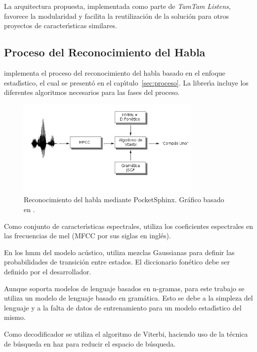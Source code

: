La arquitectura propuesta, implementada como parte de \emph{TamTam Listens}, favorece la modularidad
y facilita la reutilizaci\'on de la soluci\'on para otros proyectos de caracter{\'\i}sticas similares.

\subsection{Proceso del Reconocimiento del Habla}
\label{sec:proceso-solucion}

 implementa el proceso del reconocimiento del habla basado en el enfoque 
estad{\'\i}stico, el cual se present\'o en el cap{\'\i}tulo~\ref{sec:proceso}. La librer{\'\i}a incluye
los diferentes algoritmos necesarios para las fases del proceso.

\begin{figure}[H] 
\centering
\includegraphics[width=0.8\textwidth]{./graphics/pocketsphinx.png}
\caption{Reconocimiento del habla mediante PocketSphinx. Gr\'afico basado en \cite{VerenichASR}.}
\label{figure:proceso-pocketsphinx}
\end{figure}

Como conjunto de caracter{\'\i}sticas espectrales,  utiliza los coeficientes
espectrales en las frecuencias de mel (MFCC por sus siglas en ingl\'es).

En los \gls{hmm} del modelo ac\'ustico, utiliza mezclas Gaussianas para definir las probabilidades de 
transici\'on entre estados. El diccionario fon\'etico debe ser definido por el desarrollador.

Aunque  soporta modelos de lenguaje basados en n-gramas, para este trabajo 
se utiliza un modelo de lenguaje basado en gram\'atica. Esto se debe a la simpleza del lenguaje y a la 
falta de datos de entrenamiento para un modelo estad{\'\i}stico del mismo.

Como decodificador se utiliza el algoritmo de Viterbi, haciendo uso de la t\'ecnica de b\'usqueda en haz
para reducir el espacio de b\'usqueda.

